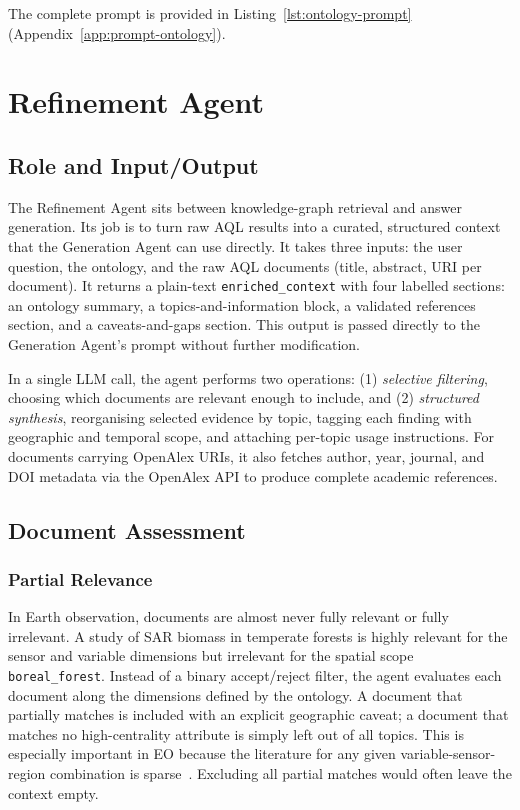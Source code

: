 The complete prompt is provided in Listing~\ref{lst:ontology-prompt} (Appendix~\ref{app:prompt-ontology}).


\section{Refinement Agent}
\label{sec:refinement-agent}

\subsection{Role and Input/Output}
\label{subsec:refinement-role}

The Refinement Agent sits between knowledge-graph retrieval and answer generation. Its job is to turn raw AQL results into a curated, structured context that the Generation Agent can use directly. It takes three inputs: the user question, the ontology, and the raw AQL documents (title, abstract, URI per document). It returns a plain-text \texttt{enriched\_context} with four labelled sections: an ontology summary, a topics-and-information block, a validated references section, and a caveats-and-gaps section. This output is passed directly to the Generation Agent's prompt without further modification.

In a single LLM call, the agent performs two operations: (1) \emph{selective filtering}, choosing which documents are relevant enough to include, and (2) \emph{structured synthesis}, reorganising selected evidence by topic, tagging each finding with geographic and temporal scope, and attaching per-topic usage instructions. For documents carrying OpenAlex URIs, it also fetches author, year, journal, and DOI metadata via the OpenAlex API to produce complete academic references.

\subsection{Document Assessment}
\label{subsec:document-assessment}

\subsubsection{Partial Relevance}
\label{subsubsec:partial-relevance}

In Earth observation, documents are almost never fully relevant or fully irrelevant. A study of SAR biomass in temperate forests is highly relevant for the sensor and variable dimensions but irrelevant for the spatial scope \texttt{boreal\_forest}. Instead of a binary accept/reject filter, the agent evaluates each document along the dimensions defined by the ontology. A document that partially matches is included with an explicit geographic caveat; a document that matches no high-centrality attribute is simply left out of all topics. This is especially important in EO because the literature for any given variable-sensor-region combination is sparse~\citep{aschbacher2020earth}. Excluding all partial matches would often leave the context empty.

